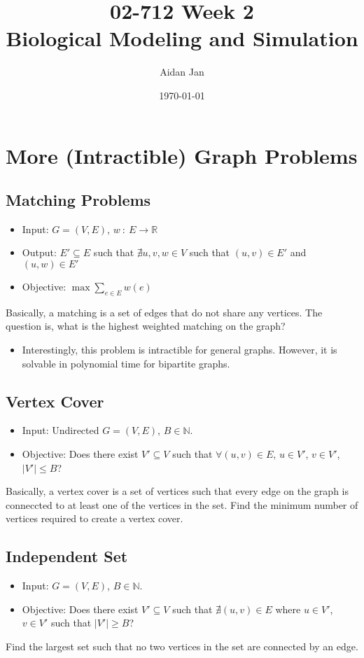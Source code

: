 \documentclass[10pt]{article}
\title{02-712 Week 2 \\ \large{Biological Modeling and Simulation}}
\author{Aidan Jan}
\date{\today}
\begin{document}
\maketitle

\section*{More (Intractible) Graph Problems}
\subsection*{Matching Problems}
\begin{itemize}
	\item Input: $G = (V, E)$, $w \::\: E \rightarrow \mathbb{R}$
	\item Output: $E' \subseteq E$ such that $\nexists u, v, w \in V$ such that $(u, v) \in E'$ and $(u, w) \in E'$
	\item Objective: $\max \sum_{e \in E} w(e)$
\end{itemize}
Basically, a matching is a set of edges that do not share any vertices.  The question is, what is the highest weighted matching on the graph?
\begin{itemize}
	\item Interestingly, this problem is intractible for general graphs.  However, it is solvable in polynomial time for bipartite graphs.
\end{itemize}

\subsection*{Vertex Cover}
\begin{itemize}
	\item Input: Undirected $G = (V, E)$, $B \in \mathbb{N}$.
	\item Objective: Does there exist $V' \subseteq V$ such that $\forall (u, v) \in E$, $u \in V'$, $v \in V'$, $|V'| \leq B$?
\end{itemize}
Basically, a vertex cover is a set of vertices such that every edge on the graph is conneccted to at least one of the vertices in the set.  Find the minimum number of vertices required to create a vertex cover.

\subsection*{Independent Set}
\begin{itemize}
	\item Input: $G = (V, E)$, $B \in \mathbb{N}$.
	\item Objective: Does there exist $V' \subseteq V$ such that $\nexists (u, v) \in E$ where $u \in V'$, $v \in V'$ such that $|V'| \geq B$?
\end{itemize}
Find the largest set such that no two vertices in the set are connected by an edge.
\end{document}

